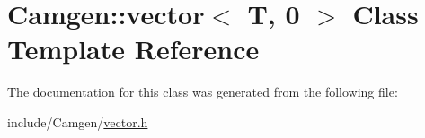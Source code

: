 \hypertarget{a00580}{}\section{Camgen\+:\+:vector$<$ T, 0 $>$ Class Template Reference}
\label{a00580}


The documentation for this class was generated from the following file\+:\begin{DoxyCompactItemize}
\item 
include/\+Camgen/\hyperlink{a00833}{vector.\+h}\end{DoxyCompactItemize}
